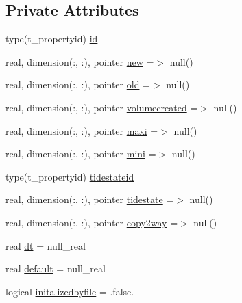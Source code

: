 \subsection*{Private Attributes}
\begin{DoxyCompactItemize}
\item 
type(t\+\_\+propertyid) \mbox{\hyperlink{structmodulehydrodynamic_1_1t__waterlevel_a0f271d13c039ff6f0fcefb3da7e6d240}{id}}
\item 
real, dimension(\+:, \+:), pointer \mbox{\hyperlink{structmodulehydrodynamic_1_1t__waterlevel_a365a01670075993a2b25730b85d392e8}{new}} =$>$ null()
\item 
real, dimension(\+:, \+:), pointer \mbox{\hyperlink{structmodulehydrodynamic_1_1t__waterlevel_afc52a5c0f34e70331fc29e6c1eaee573}{old}} =$>$ null()
\item 
real, dimension(\+:, \+:), pointer \mbox{\hyperlink{structmodulehydrodynamic_1_1t__waterlevel_a104b755468bfec235b00566200d41042}{volumecreated}} =$>$ null()
\item 
real, dimension(\+:, \+:), pointer \mbox{\hyperlink{structmodulehydrodynamic_1_1t__waterlevel_a6ec418b75ae680b67b815e64be829249}{maxi}} =$>$ null()
\item 
real, dimension(\+:, \+:), pointer \mbox{\hyperlink{structmodulehydrodynamic_1_1t__waterlevel_a8b4e0ee3ed71eb17bbbc9742601131be}{mini}} =$>$ null()
\item 
type(t\+\_\+propertyid) \mbox{\hyperlink{structmodulehydrodynamic_1_1t__waterlevel_aa1c44c2c646ea90339d20e9d01aa3a08}{tidestateid}}
\item 
real, dimension(\+:, \+:), pointer \mbox{\hyperlink{structmodulehydrodynamic_1_1t__waterlevel_a319dc42cecbc5def38a08e41b29ecf58}{tidestate}} =$>$ null()
\item 
real, dimension(\+:, \+:), pointer \mbox{\hyperlink{structmodulehydrodynamic_1_1t__waterlevel_a5af7bd2684259f38a0ddd205234e6cd7}{copy2way}} =$>$ null()
\item 
real \mbox{\hyperlink{structmodulehydrodynamic_1_1t__waterlevel_a187f147c6925fa4f6f1d4fab390c19eb}{dt}} = null\+\_\+real
\item 
real \mbox{\hyperlink{structmodulehydrodynamic_1_1t__waterlevel_ab0317dee2da95a829c6996f5222a9f94}{default}} = null\+\_\+real
\item 
logical \mbox{\hyperlink{structmodulehydrodynamic_1_1t__waterlevel_a3187132ae71193ecbea756a0a446b3f4}{initalizedbyfile}} = .false.
\end{DoxyCompactItemize}


